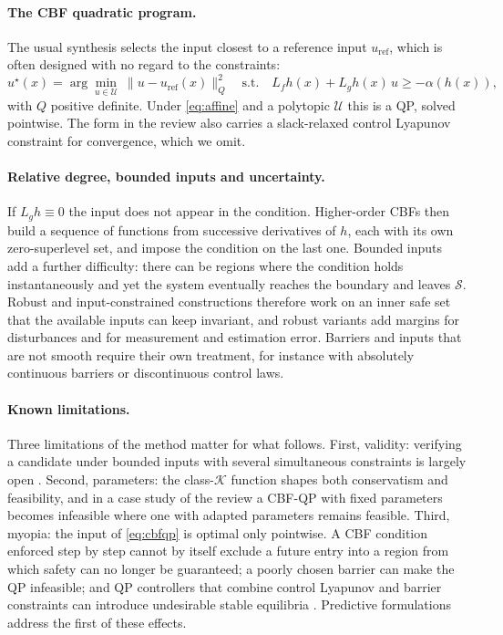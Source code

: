 \documentclass[11pt]{article}
\theoremstyle{definition}
\begin{document}
\paragraph{The CBF quadratic program.} The usual synthesis selects the input closest to a reference input
$u_{\mathrm{ref}}$, which is often designed with no regard to the constraints:
\begin{equation}
u^\star(x)=\arg\min_{u\in\mathcal{U}}\ \|u-u_{\mathrm{ref}}(x)\|_Q^2\quad\text{s.t.}\quad L_fh(x)+L_gh(x)\,u\ge-\alpha(h(x)),
\label{eq:cbfqp}
\end{equation}
with $Q$ positive definite. Under \eqref{eq:affine} and a polytopic $\mathcal{U}$ this is a QP, solved pointwise. The form
in the review also carries a slack-relaxed control Lyapunov constraint for convergence, which we omit.

\paragraph{Relative degree, bounded inputs and uncertainty.} If $L_gh\equiv0$ the input does not appear in the condition.
Higher-order CBFs then build a sequence of functions from successive derivatives of $h$, each with its own zero-superlevel
set, and impose the condition on the last one. Bounded inputs add a further difficulty: there can be regions where the
condition holds instantaneously and yet the system eventually reaches the boundary and leaves $\mathcal{S}$. Robust and
input-constrained constructions therefore work on an inner safe set that the available inputs can keep invariant, and
robust variants add margins for disturbances and for measurement and estimation error. Barriers and inputs that are not
smooth require their own treatment, for instance with absolutely continuous barriers or discontinuous control laws.

\paragraph{Known limitations.} Three limitations of the method matter for what follows. First, validity: verifying a
candidate under bounded inputs with several simultaneous constraints is largely open \citep{garg2024advances}. Second,
parameters: the class-$\mathcal{K}$ function shapes both conservatism and feasibility, and in a case study of the review a
CBF-QP with fixed parameters becomes infeasible where one with adapted parameters remains feasible. Third, myopia: the input
of \eqref{eq:cbfqp} is optimal only pointwise. A CBF condition enforced step by step cannot by itself exclude a future
entry into a region from which safety can no longer be guaranteed; a poorly chosen barrier can make the QP infeasible;
and QP controllers that combine control Lyapunov and barrier constraints can introduce undesirable stable equilibria
\citep{reis2020undesirable}. Predictive formulations address the first of these effects.
\end{document}
